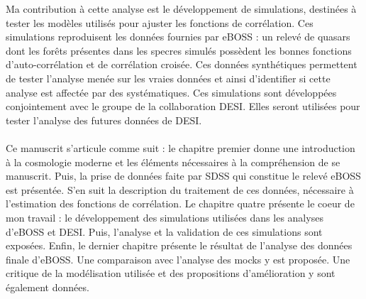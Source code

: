 Ma contribution à cette analyse est le développement de simulations, destinées à tester les modèles utilisés pour ajuster les fonctions de corrélation.
Ces simulations reproduisent les données fournies par eBOSS : un relevé de quasars dont les forêts \lya{} présentes dans les specres simulés possèdent les bonnes fonctions d'auto-corrélation et de corrélation croisée.
Ces données synthétiques permettent de tester l'analyse menée sur les vraies données et ainsi d'identifier si cette analyse est affectée par des systématiques.
Ces simulations sont développées conjointement avec le groupe \lya{} de la collaboration DESI. Elles seront utilisées pour tester l'analyse des futures données de DESI.

\paragraph{}
\thispagestyle{empty}
Ce manuscrit s'articule comme suit : le chapitre premier donne une introduction à la cosmologie moderne et les éléments nécessaires à la compréhension de se manuscrit.
Puis, la prise de données faite par SDSS qui constitue le relevé eBOSS est présentée.
S'en suit la description du traitement de ces données, nécessaire à l'estimation des fonctions de corrélation.
Le chapitre quatre présente le coeur de mon travail : le développement des simulations utilisées dans les analyses \lya{} d'eBOSS et DESI.
Puis, l'analyse et la validation de ces simulations sont exposées.
Enfin, le dernier chapitre présente le résultat de l'analyse des données finale d'eBOSS. Une comparaison avec l'analyse des mocks y est proposée.
Une critique de la modélisation utilisée et des propositions d'amélioration y sont également données.
